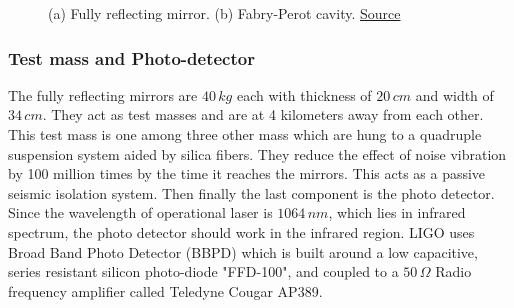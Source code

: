 \begin{figure}[h]
    \centering
    \qquad
    \caption{(a) Fully reflecting mirror.\cite{mirrors} (b) Fabry-Perot cavity. \href{https://www.ligo.caltech.edu/page/ligos-ifo}{Source}}
\end{figure}


\subsubsection{Test mass and Photo-detector}

The fully reflecting mirrors are $40 \,kg$ each with thickness of $20\,cm$ and width of $34\,cm$. They act as test masses and are at 4 kilometers away from each other. This test mass is one among three other mass which are hung to a quadruple suspension system aided by silica fibers. They reduce the effect of noise vibration by 100 million times by the time it reaches the mirrors. This acts as a passive seismic isolation system. \cite{mirrors} Then finally the last component is the photo detector. Since the wavelength of operational laser is $1064\,nm$, which lies in infrared spectrum, the photo detector should work in the infrared region. LIGO uses Broad Band Photo Detector (BBPD) which is built around a low capacitive, series resistant silicon photo-diode "FFD-100", and coupled to a $50\,\Omega$  Radio frequency amplifier called Teledyne Cougar AP389. \cite{BBPD}

\pagebreak

